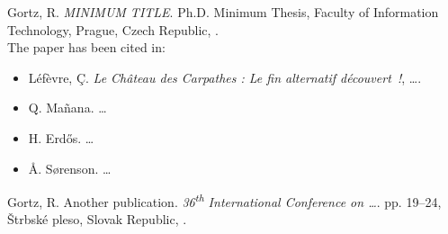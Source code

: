 \documentclass[12pt,twoside,a4paper,final]{memoir}%
\begin{document}
\renewcommand\bibname{Remaining Publications of the Author Relevant to the Thesis}
\begin{thebibliography}{A.9}%
Gortz, R.
\newblock \textit{MINIMUM TITLE}.
\newblock Ph.D. Minimum Thesis, Faculty of Information Technology,
\newblock Prague, Czech Republic,
.
\bigskip \\ \smallskip The paper has been cited in:
\begin{itemize}
\item L\'ef\`evre, \c{C}. \textit{Le Ch\^ateau des Carpathes : Le fin alternatif d\'ecouvert~!}, \dots.
\item Q. Ma\~nana. \dots
\item H. Erd\H{o}s. \dots
\item \r{A}. S\o renson. \dots

\end{itemize}
\end{thebibliography}

\renewcommand\bibname{Remaining Publications of the Author}
\begin{thebibliography}{A.9}%
Gortz, R.
\newblock Another publication.
\newblock \textit{36\textsuperscript{th} International Conference on \dots}. pp. 19--24, \v{S}trbsk\'e pleso, Slovak Republic,
.
\end{thebibliography}

\appendix

\appendix


\end{document}
